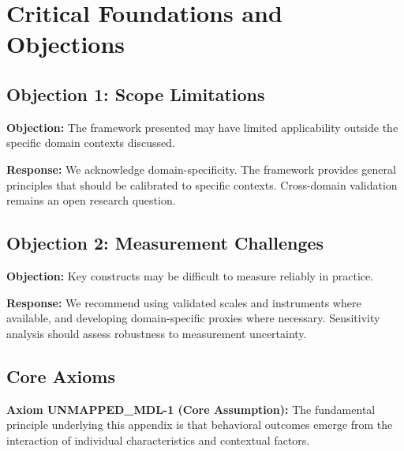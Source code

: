 
\section{Critical Foundations and Objections}
\label{sec:mdl-foundations}

\subsection{Objection 1: Scope Limitations}

\textbf{Objection:} The framework presented may have limited applicability
outside the specific domain contexts discussed.

\textbf{Response:} We acknowledge domain-specificity. The framework provides
general principles that should be calibrated to specific contexts. Cross-domain
validation remains an open research question.

\subsection{Objection 2: Measurement Challenges}

\textbf{Objection:} Key constructs may be difficult to measure reliably in
practice.

\textbf{Response:} We recommend using validated scales and instruments where
available, and developing domain-specific proxies where necessary. Sensitivity
analysis should assess robustness to measurement uncertainty.



\subsection{Core Axioms}
\label{sec:mdl-axioms}

\begin{tcolorbox}[colback=yellow!5!white,colframe=yellow!75!black,title=Axiom UNMAPPED_MDL-1: Fundamental Principle]
\textbf{Axiom UNMAPPED_MDL-1 (Core Assumption):}
The fundamental principle underlying this appendix is that behavioral outcomes
emerge from the interaction of individual characteristics and contextual factors.
\end{tcolorbox}

